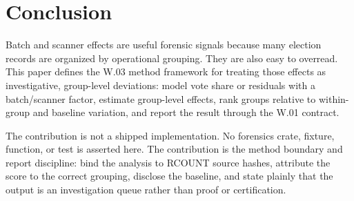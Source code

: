 \section{Conclusion}

Batch and scanner effects are useful forensic signals because many election
records are organized by operational grouping. They are also easy to overread.
This paper defines the W.03 method framework for treating those effects as
investigative, group-level deviations: model vote share or residuals with a
batch/scanner factor, estimate group-level effects, rank groups relative to
within-group and baseline variation, and report the result through the W.01
contract.

The contribution is not a shipped implementation. No forensics crate, fixture,
function, or test is asserted here. The contribution is the method boundary and
report discipline: bind the analysis to RCOUNT source hashes, attribute the
score to the correct grouping, disclose the baseline, and state plainly that the
output is an investigation queue rather than proof or certification.
